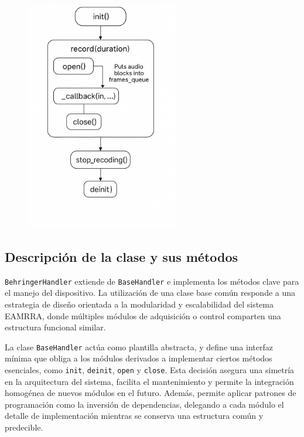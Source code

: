 \begin{figure}[htpb]
    \centering
    \includegraphics[width=0.6\textwidth]{graficos/workflow.png}
    \label{fig:workflow}
\end{figure}




\subsection{Descripción de la clase y sus métodos}

\texttt{BehringerHandler} extiende de \texttt{BaseHandler} e implementa los métodos clave para el manejo del dispositivo. La utilización de una clase base común responde a una estrategia de diseño orientada a la modularidad y escalabilidad del sistema EAMRRA, donde múltiples módulos de adquisición o control comparten una estructura funcional similar. 

La clase \texttt{BaseHandler} actúa como plantilla abstracta, y define una interfaz mínima que obliga a los módulos derivados a implementar ciertos métodos esenciales, como \texttt{init}, \texttt{deinit}, \texttt{open} y \texttt{close}. Esta decisión asegura una simetría en la arquitectura del sistema, facilita el mantenimiento y permite la integración homogénea de nuevos módulos en el futuro. Además, permite aplicar patrones de programación como la inversión de dependencias, delegando a cada módulo el detalle de implementación mientras se conserva una estructura común y predecible.

